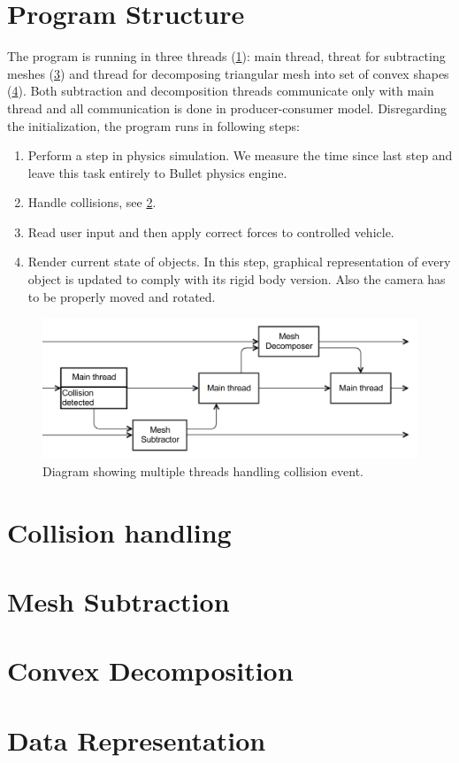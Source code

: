 \section{Program Structure}
The program is running in three threads (\cref{fig:threads}): main thread, threat for subtracting meshes (\cref{sec:subtraction}) and thread for decomposing triangular mesh into set of convex shapes (\cref{sec:decomposition}). Both subtraction and decomposition threads communicate only with main thread and all communication is done in producer-consumer model. Disregarding the initialization, the program runs in following steps:
\begin{enumerate}
\item Perform a step in physics simulation. We measure the time since last step and leave this task entirely to Bullet physics engine.
\item Handle collisions, see \cref{sec:collisions}.
\item Read user input and then apply correct forces to controlled vehicle.
\item Render current state of objects. In this step, graphical representation of every object is updated to comply with its rigid body version. Also the camera has to be properly moved and rotated.
\end{enumerate}

\begin{figure}
        \centering
        \includegraphics[width=\textwidth]{img/decompositionFlow}
        \caption{Diagram showing multiple threads handling collision event. }
        \label{fig:threads}
\end{figure}



\section{Collision handling}
\label{sec:collisions}


\section{Mesh Subtraction}
\label{sec:subtraction}

\section{Convex Decomposition}
\label{sec:decomposition}

\section{Data Representation}

